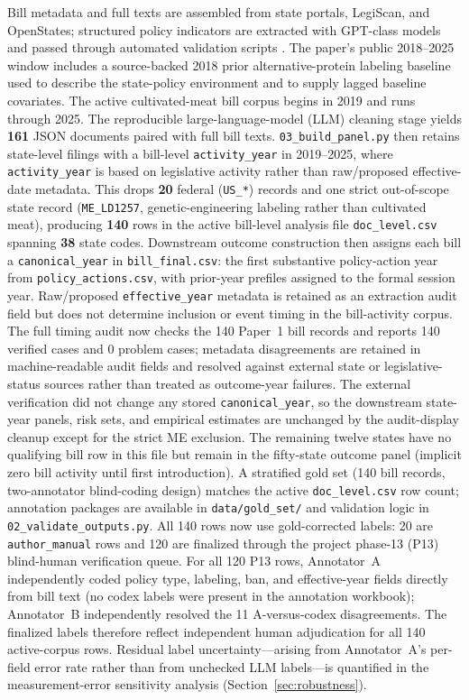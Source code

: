 \documentclass[12pt]{article}
\begin{document}
Bill metadata and full texts are assembled from state portals, LegiScan, and OpenStates; structured policy indicators are extracted with GPT-class models and passed through automated validation scripts \citep{grimmer2013text,lazer2009computational}.  The paper's public 2018--2025 window includes a source-backed 2018 prior alternative-protein labeling baseline used to describe the state-policy environment and to supply lagged baseline covariates.  The active cultivated-meat bill corpus begins in 2019 and runs through 2025.  The reproducible large-language-model (LLM) cleaning stage yields \textbf{161} JSON documents paired with full bill texts.  \texttt{03\_build\_panel.py} then retains state-level filings with a bill-level \texttt{activity\_year} in 2019--2025, where \texttt{activity\_year} is based on legislative activity rather than raw/proposed effective-date metadata.  This drops \textbf{20} federal (\texttt{US\_*}) records and one strict out-of-scope state record (\texttt{ME\_LD1257}, genetic-engineering labeling rather than cultivated meat), producing \textbf{140} rows in the active bill-level analysis file \texttt{doc\_level.csv} spanning \textbf{38} state codes.  Downstream outcome construction then assigns each bill a \texttt{canonical\_year} in \texttt{bill\_final.csv}: the first substantive policy-action year from \texttt{policy\_actions.csv}, with prior-year prefiles assigned to the formal session year.  Raw/proposed \texttt{effective\_year} metadata is retained as an extraction audit field but does not determine inclusion or event timing in the bill-activity corpus.  The full timing audit now checks the 140 Paper~1 bill records and reports 140 verified cases and 0 problem cases; metadata disagreements are retained in machine-readable audit fields and resolved against external state or legislative-status sources rather than treated as outcome-year failures.  The external verification did not change any stored \texttt{canonical\_year}, so the downstream state-year panels, risk sets, and empirical estimates are unchanged by the audit-display cleanup except for the strict ME exclusion.  The remaining twelve states have no qualifying bill row in this file but remain in the fifty-state outcome panel (implicit zero bill activity until first introduction).  A stratified gold set (140 bill records, two-annotator blind-coding design) matches the active \texttt{doc\_level.csv} row count; annotation packages are available in \texttt{data/gold\_set/} and validation logic in \texttt{02\_validate\_outputs.py}.  All 140 rows now use gold-corrected labels: 20 are \texttt{author\_manual} rows and 120 are finalized through the project phase-13 (P13) blind-human verification queue.  For all 120 P13 rows, Annotator~A independently coded policy type, labeling, ban, and effective-year fields directly from bill text (no codex labels were present in the annotation workbook); Annotator~B independently resolved the 11 A-versus-codex disagreements.  The finalized labels therefore reflect independent human adjudication for all 140 active-corpus rows.  Residual label uncertainty---arising from Annotator~A's per-field error rate rather than from unchecked LLM labels---is quantified in the measurement-error sensitivity analysis (Section~\ref{sec:robustness}).
\end{document}
